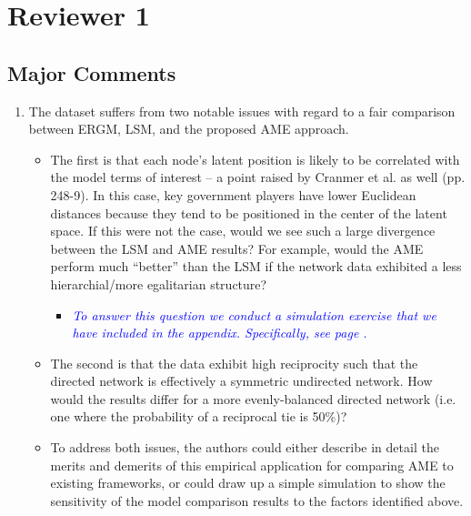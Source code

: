 \section{Reviewer 1}

\subsection{Major Comments}

\begin{enumerate}
	\item  The dataset suffers from two notable issues with regard to a fair comparison between ERGM, LSM, and the proposed AME approach. 
	\begin{itemize}
		\item The first is that each node’s latent position is likely to be correlated with the model terms of interest – a point raised by Cranmer et al. as well (pp. 248-9). In this case, key government players have lower Euclidean distances because they tend to be positioned in the center of the latent space. If this were not the case, would we see such a large divergence between the LSM and AME results? For example, would the AME perform much ``better'' than the LSM if the network data exhibited a less hierarchial/more egalitarian structure? 
			\begin{itemize}
				\item \textcolor{blue}{ \emph{
				To answer this question we conduct a simulation exercise that we have included in the appendix. Specifically, see page .
				}}
			\end{itemize}	
		\item The second is that the data exhibit high reciprocity such that the directed network is effectively a symmetric undirected network. How would the results differ for a more evenly-balanced directed network (i.e. one where the probability of a reciprocal tie is 50\%)? 
		\item To address both issues, the authors could either describe in detail the merits and demerits of this empirical application for comparing AME to existing frameworks, or could draw up a simple simulation to show the sensitivity of the model comparison results to the factors identified above. %
	\end{itemize}
\end{enumerate}

